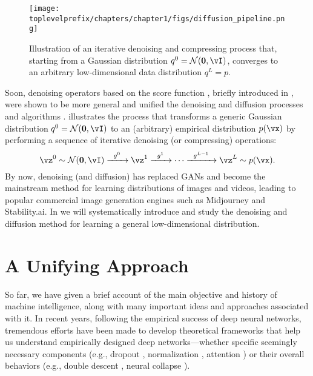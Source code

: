 \documentclass[../../book-main.tex]{subfiles}
\begin{document}
\begin{figure}[t]
    \centering
    \texttt{[image: \\toplevelprefix/chapters/chapter1/figs/diffusion\_pipeline.png]}
    \caption{Illustration of an iterative denoising and compressing process that, starting from a Gaussian distribution \(q^{0} = \mathcal{N}(\vzero, \vI)\), converges to an arbitrary low-dimensional data distribution \(q^{L} = p\).}
    \label{fig:diffusion}
\end{figure}

Soon, denoising operators based on the score function \cite{hyvarinen05a}, briefly introduced in , were shown to be more general and unified the denoising and diffusion processes and algorithms \cite{song2019,song2020score,ho2020denoising}.  illustrates the process that transforms a generic Gaussian distribution \(q^{0} = \mathcal{N}(\vzero, \vI)\) to an (arbitrary) empirical distribution \(p(\vx)\) by performing a sequence of iterative denoising (or compressing) operations:
\begin{equation}
    \vz^{0} \sim  \mathcal{N}(\vzero, \vI) \xrightarrow{\hspace{2mm} g^{0} \hspace{2mm}} \vz^{1} \xrightarrow{\hspace{2mm} g^{1} \hspace{2mm}} \cdots \xrightarrow{\hspace{2mm} g^{L-1} \hspace{2mm}} \vz^{L} \sim p(\vx).
\end{equation}
By now, denoising (and diffusion) has replaced GANs and become the mainstream method for learning distributions of images and videos, leading to popular commercial image generation engines such as Midjourney and Stability.ai. 
In  we will systematically introduce and study the denoising and diffusion method for learning a general low-dimensional distribution.


\section{A Unifying Approach}\label{sec:unifying-approach}
So far, we have given a brief account of the main objective and history of machine intelligence, along with many important ideas and approaches associated with it. In recent years, following the empirical success of deep neural networks, tremendous efforts have been made to develop theoretical frameworks that help us understand empirically designed deep networks---whether specific seemingly necessary components (e.g., dropout \cite{srivastava2014dropout}, normalization \cite{ioffe2015batch,ba2016layer}, attention \cite{vaswani2017attention}) or their overall behaviors (e.g., double descent \cite{belkin2019reconciling}, neural collapse \cite{papyan2020prevalence}).
\end{document}
